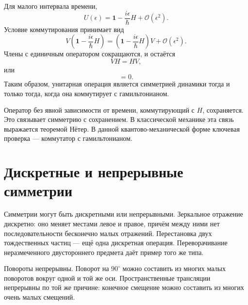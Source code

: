 Для малого интервала времени,
\begin{equation}
U(\epsilon)
=
\mathbf 1-\frac{i\epsilon}{\hbar}H
+\mathcal O(\epsilon^2).
\end{equation}
Условие коммутирования принимает вид
\begin{equation}
V\left(
\mathbf 1-\frac{i\epsilon}{\hbar}H
\right)
=
\left(
\mathbf 1-\frac{i\epsilon}{\hbar}H
\right)V
+\mathcal O(\epsilon^2).
\end{equation}
Члены с единичным оператором сокращаются, и остаётся
\begin{equation}
VH=HV,
\end{equation}
или
\begin{equation}
[V,H]=0.
\end{equation}
Таким образом, унитарная операция является симметрией динамики тогда и только тогда, когда она коммутирует с гамильтонианом.

\begin{classroomqa}
\end{classroomqa}

Оператор без явной зависимости от времени, коммутирующий с \(H\), сохраняется. Это связывает симметрию с сохранением. В классической механике эта связь выражается теоремой Нётер. В данной квантово-механической форме ключевая проверка — коммутатор с гамильтонианом.

\section{Дискретные и непрерывные симметрии}

Симметрии могут быть дискретными или непрерывными. Зеркальное отражение дискретно: оно меняет местами левое и правое, причём между ними нет последовательности бесконечно малых отражений. Перестановка двух тождественных частиц — ещё одна дискретная операция. Переворачивание неразмеченного двустороннего предмета даёт пример того же типа.

Повороты непрерывны. Поворот на \(90^\circ\) можно составить из многих малых поворотов вокруг одной и той же оси. Пространственные трансляции непрерывны по той же причине: конечное смещение можно составить из многих очень малых смещений.

